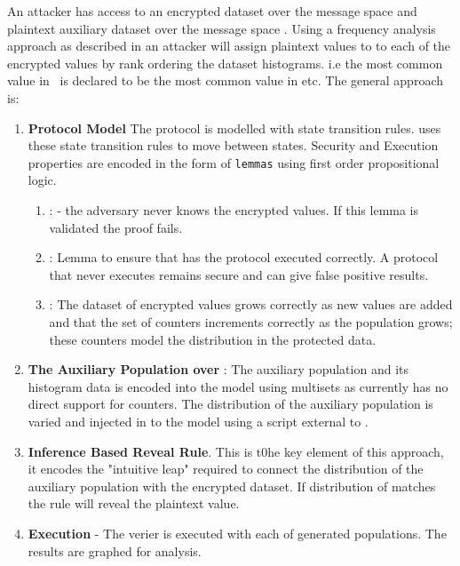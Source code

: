 \documentclass[journal]{IEEEtran}
\begin{document}
An attacker has access to an encrypted dataset \enc{} over the message space \encSpace{} and plaintext auxiliary dataset \aux{} over the message space \auxSpace. Using a frequency analysis approach as described in \cite{InfrenceAttacks} an attacker will assign plaintext values to to each of the encrypted values by rank ordering the dataset histograms. i.e the most common value in \enc{}\ is declared to be the most common value in \aux{} etc. 
The general approach is:
\begin{enumerate}[label=(\Alph*)]
\item \textbf{Protocol Model} The protocol is modelled with \tamarin{} state transition rules. \tamarin{} uses these state transition rules to move between states. Security and Execution properties are encoded in the form of \texttt{lemmas} using first order propositional logic. 
\begin{enumerate}
	\item {}: - the adversary never knows the encrypted values. If this lemma is validated the proof fails.
    \item {}: Lemma to ensure that has the protocol executed correctly. A protocol that never executes remains secure and can give false positive results.
	\item {}: The dataset of encrypted values grows correctly as new values are added and that the set of counters increments correctly as the population grows; these counters model the distribution in the protected data.
\end{enumerate}

\item \textbf{The Auxiliary Population \aux{} over \auxSpace}: The auxiliary population and its histogram data is encoded into the model using \tamarin{} multisets as \tamarin{} currently has no direct support for counters. The distribution of the auxiliary population is varied and injected in to the model using a script external to \tamarin{}.
\item\textbf{ Inference Based Reveal Rule}. This is t0he key element of this approach, it encodes the "intuitive leap" required to connect the distribution of the auxiliary population with the encrypted dataset.   If  distribution of \aux{} matches \enc{} the rule will reveal the plaintext value.
\item \textbf{Execution}
	- The \tamarin{} verier is executed with each of generated \aux{} populations. The results are graphed for analysis.
\end{enumerate}
\end{document}
